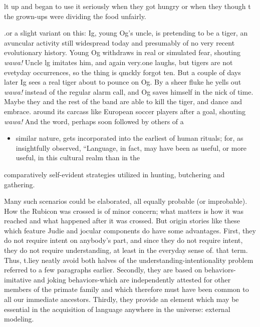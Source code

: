 lt up and began to use it seriously when they got hungry or when they though t the grown-ups were dividing the food unfairly.

.or a slight variant on this: Ig, young Og's uncle, is pretending to be a tiger, an avuncular activity still widespread today and presumably of no very recent evolutionary history. Young Og withdraws in real or simulated fear, shouting \textit{wawa!} Uncle lg imitates him, and again very.one laughs, but tigers are not evetyday occurrences, so the thing is qmckly forgot ten. But a couple of days later Ig sees a real tiger about to pounce on Og. By a sheer fluke he yells out \textit{wawa!} instead of the regular alarm call, and Og saves himself in the nick of time. Maybe they and the rest of the band are able to kill the tiger, and dance and em\-brace. around its carcass like European soccer players after a goal, shouting \textit{wawa! }And the word, perhaps soon followed by others of a

\begin{itemize}
\item similar nature, gets incorporated into the earliest of human rituals; for, as \citet{Marshack1976} insightfully observed, ``Language, in fact, may have been as useful, or more useful, in this cultural realm than in the
\end{itemize}

comparatively self-evident strategies utilized in hunting, butchering and gathering.{\textquotedbl}


Many such scenarios could be elaborated, all equally probable (or improbable). How the Rubicon was crossed is of minor concern; what matters is how it was reached and what happened after it was crossed. But origin stories like these which feature Judie and jocular compo\-nents do have some advantages. First, they do not require intent on anybody's part, and since they do not require intent, they do not require understanding, at least in the everyday sense of. that term. Thus, t.liey neatly avoid both halves of the understanding-intentionality problem referred to a few paragraphs earlier. Secondly, they are based on behaviors- imitative and joking behaviors-which are independently attested for other members of the primate family and which therefore must have been common to all our immediate ancestors. Thirdly, they provide an element which may be essential in the acquisition of lan\-guage anywhere in the universe: external modeling.

